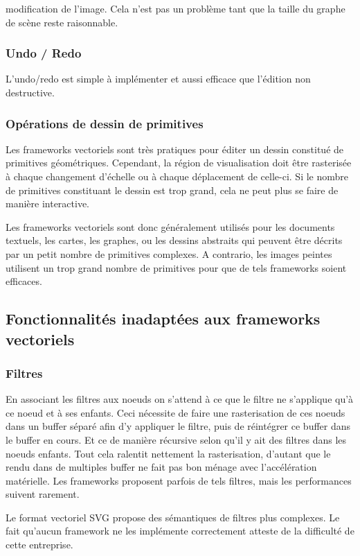 				modification de l'image. Cela n'est pas un problème tant que la taille du graphe de scène reste raisonnable.
			\subsubsection{Undo / Redo}
				L'undo/redo est simple à implémenter et aussi efficace que l'édition non destructive. 
			\subsubsection{Opérations de dessin de primitives}
				Les frameworks vectoriels sont très pratiques pour éditer un dessin constitué de primitives géométriques. Cependant, la région de
				visualisation doit être rasterisée à chaque changement d'échelle ou à chaque déplacement de celle-ci. Si le nombre de primitives
				constituant le dessin est trop grand, cela ne peut plus se faire de manière interactive.
				
				Les frameworks vectoriels sont donc généralement utilisés pour les documents textuels, les cartes, les graphes, ou les dessins abstraits
				qui peuvent être décrits par un petit nombre de primitives complexes. A contrario, les images peintes utilisent 
				un trop grand nombre de primitives pour que de tels frameworks soient efficaces. 
		\subsection{Fonctionnalités inadaptées aux frameworks vectoriels}
			\subsubsection{Filtres}
				En associant les filtres aux noeuds on s'attend à ce que le filtre ne s'applique
				qu'à ce noeud et à ses enfants. Ceci nécessite de faire une rasterisation de ces noeuds dans un buffer séparé afin d'y appliquer le
				filtre, puis de réintégrer ce buffer dans le buffer en cours. Et ce de manière récursive selon qu'il y ait des filtres dans les
				noeuds enfants. 
				Tout cela ralentit nettement la rasterisation, d'autant que le rendu dans de multiples buffer ne fait pas bon ménage avec 
				l'accélération matérielle. Les frameworks proposent parfois de tels filtres, mais les performances suivent rarement.
				
				Le format vectoriel SVG propose des sémantiques de filtres plus complexes. Le fait qu'aucun framework ne les implémente correctement
				atteste de la difficulté de cette entreprise. 
